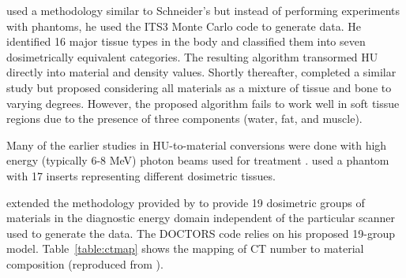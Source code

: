 \citet{ref:plessisf} used a methodology similar to Schneider's but instead of performing experiments with phantoms, he used the ITS3 \citep{ref:halbleibj} Monte Carlo code to generate data. He identified 16 major tissue types in the body and classified them into seven dosimetrically equivalent categories. The resulting algorithm transormed HU directly into material and density values. Shortly thereafter, \citet{ref:schneiderw} completed a similar study but proposed considering all materials as a mixture of tissue and bone to varying degrees. However, the proposed algorithm fails to work well in soft tissue regions due to the presence of three components (water, fat, and muscle).

Many of the earlier studies in HU-to-material conversions were done with high energy (typically 6-8 MeV) photon beams used for treatment \citep{ref:kimh} \citep{ref:vanderstraetenb}. \citet{ref:sawc} used a phantom with 17 inserts representing different dosimetric tissues.

\citet{ref:ottossonr} extended the methodology provided by \citet{ref:schneideru} to provide 19 dosimetric groups of materials in the diagnostic energy domain independent of the particular scanner used to generate the data. The DOCTORS code relies on his proposed 19-group model. Table~\ref{table:ctmap} shows the mapping of CT number to material composition (reproduced from \citep{ref:ottossonr}).

